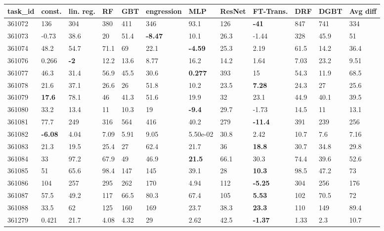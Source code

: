 \begin{table}[ht!]
\centering
\begingroup\footnotesize
\begin{tabular}{llllllllllll}
  \hline
\hline
task\_id & const. & lin. reg. & RF & GBT & engression & MLP & ResNet & FT-Trans. & DRF & DGBT & Avg diff \\ 
  \hline
361072 & 136 & 304 & 380 & 411 & 346 & 93.1 & 126 & \textbf{-41} & 847 & 741 & 334 \\ 
  361073 & -0.73 & 38.6 & 20 & 51.4 & \textbf{-8.47} & 10.1 & 26.3 & -1.44 & 328 & 45.9 & 51 \\ 
  361074 & 48.2 & 54.7 & 71.1 & 69 & 22.1 & \textbf{-4.59} & 25.3 & 2.19 & 61.5 & 14.2 & 36.4 \\ 
  361076 & 0.266 & \textbf{-2} & 12.2 & 13.6 & 8.77 & 16.2 & 14.2 & 1.64 & 7.03 & 23.2 & 9.51 \\ 
  361077 & 46.3 & 31.4 & 56.9 & 45.5 & 30.6 & \textbf{0.277} & 393 & 15 & 54.3 & 11.9 & 68.5 \\ 
  361078 & 21.6 & 37.1 & 26.6 & 26 & 51.8 & 10.2 & 23.5 & \textbf{7.28} & 24.3 & 27 & 25.6 \\ 
  361079 & \textbf{17.6} & 78.1 & 46 & 41.3 & 51.6 & 19.9 & 32 & 23.1 & 44.9 & 40.1 & 39.5 \\ 
  361080 & 33.2 & 13.4 & 11 & 10.3 & 19 & \textbf{-9.4} & 29.7 & -1.73 & 14.5 & 11 & 13.1 \\ 
  361081 & 77.7 & 249 & 316 & 564 & 416 & 40.2 & 279 & \textbf{-11.4} & 391 & 239 & 256 \\ 
  361082 & \textbf{-6.08} & 4.04 & 7.09 & 5.91 & 9.05 &  5.50e-02 & 30.8 & 2.42 & 10.7 & 7.6 & 7.16 \\ 
  361083 & 21.3 & 19.5 & 25.4 & 27 & 62.4 & 21.7 & 36 & \textbf{18.8} & 30.7 & 34.8 & 29.8 \\ 
  361084 & 33 & 97.2 & 67.9 & 49 & 46.9 & \textbf{21.5} & 66.1 & 30.3 & 74.4 & 39.6 & 52.6 \\ 
  361085 & 51 & 65.6 & 98.4 & 147 & 145 & 39.1 & 28 & \textbf{10.3} & 98.5 & 47.2 & 73 \\ 
  361086 & 104 & 257 & 295 & 262 & 170 & 4.94 & 112 & \textbf{-5.25} & 304 & 256 & 176 \\ 
  361087 & 57.5 & 49.2 & 117 & 66.5 & 80.3 & 67.4 & 105 & \textbf{5.53} & 102 & 70.5 & 72 \\ 
  361088 & 33.5 & 62 & 125 & 160 & 169 & 23.7 & 38.3 & \textbf{23.3} & 110 & 149 & 89.4 \\ 
  361279 & 0.421 & 21.7 & 4.08 & 4.32 & 29 & 2.62 & 42.5 & \textbf{-1.37} & 1.33 & 2.3 & 10.7 \\ 

\end{tabular}
\end{table}
